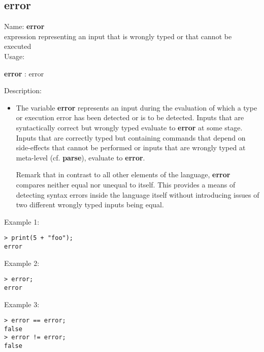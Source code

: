 \subsection{error}
\label{laberror}
\noindent Name: \textbf{error}\\
expression representing an input that is wrongly typed or that cannot be executed\\
\noindent Usage: 
\begin{center}
\textbf{error} : \textsf{error}
\\ 
\end{center}
\noindent Description: \begin{itemize}

\item The variable \textbf{error} represents an input during the evaluation of
   which a type or execution error has been detected or is to be
   detected. Inputs that are syntactically correct but wrongly typed
   evaluate to \textbf{error} at some stage.  Inputs that are correctly typed
   but containing commands that depend on side-effects that cannot be
   performed or inputs that are wrongly typed at meta-level (cf. \textbf{parse}),
   evaluate to \textbf{error}.
    
   Remark that in contrast to all other elements of the \sollya language,
   \textbf{error} compares neither equal nor unequal to itself. This provides a
   means of detecting syntax errors inside the \sollya language itself
   without introducing issues of two different wrongly typed inputs being
   equal.
\end{itemize}
\noindent Example 1: 
\begin{center}\begin{minipage}{15cm}\begin{Verbatim}[frame=single]
> print(5 + "foo");
error
\end{Verbatim}
\end{minipage}\end{center}
\noindent Example 2: 
\begin{center}\begin{minipage}{15cm}\begin{Verbatim}[frame=single]
> error;
error
\end{Verbatim}
\end{minipage}\end{center}
\noindent Example 3: 
\begin{center}\begin{minipage}{15cm}\begin{Verbatim}[frame=single]
> error == error;
false
> error != error;
false
\end{Verbatim}
\end{minipage}\end{center}
